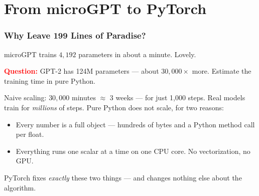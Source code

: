 \section{From microGPT to PyTorch}

\begin{frame}
    \frametitle{Why Leave 199 Lines of Paradise?}

    microGPT trains $4{,}192$ parameters in about a minute. Lovely.

    \pause

    \textcolor{red}{\textbf{Question:}} GPT-2 has 124M parameters --- about $30{,}000\times$ more. Estimate the training time in pure Python.

    \pause

    Naive scaling: $30{,}000$ minutes $\approx$ \alert{3 weeks} --- for just 1{,}000 steps. Real models train for \emph{millions} of steps. Pure Python does not scale, for two reasons:
    \begin{itemize}
        \item Every number is a full  \alert{object} --- hundreds of bytes and a Python method call per float.
        \item Everything runs \alert{one scalar at a time} on \alert{one CPU core}. No vectorization, no GPU.
    \end{itemize}

    \pause

    PyTorch fixes \emph{exactly} these two things --- and changes \alert{nothing else} about the algorithm.
\end{frame}


